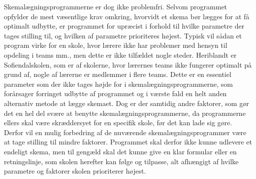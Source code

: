 Skemalægningsprogrammerne er dog ikke problemfri. Selvom programmet opfylder de mest væsentlige krav omkring, hvorvidt et skema bør lægges for at få optimalt udbytte, er programmet for upræcist i forhold til hvilke parametre der tages stilling til, og hvilken af parametre prioriteres højest. Typisk vil sådan et program virke for en skole, hvor lærere ikke har problemer med hensyn til opdeling i teams mm., men dette er ikke tilfældet nogle steder. Heriblandt er Sofiendalskolen, som er af skolerne, hvor lærernes teams ikke fungerer optimalt på grund af, nogle af lærerne er medlemmer i flere teams. Dette er en essentiel parameter som der ikke tages højde for i skemalægningsprogrammerne, som forårsager forringet udbytte af programmet og i værste fald en helt anden alternativ metode at lægge skemaet. Dog er der samtidig andre faktorer, som gør det en hel del svære at benytte skemalægningsprogrammerne, da programmerne ellers skal være skræddersyet for en specifik skole, før det kan lade sig gøre.
Derfor vil en mulig forbedring af de nuværende skemalægningsprogrammer være at tage stilling til mindre faktorer. Programmet skal derfor ikke kunne udlevere et endeligt skema, men til gengæld skal det kunne give en klar formular eller en retningslinje, som skolen herefter kan følge og tilpasse, alt afhængigt af hvilke parametre og faktorer skolen prioriterer højest\cite{ebbesen2015}. 
